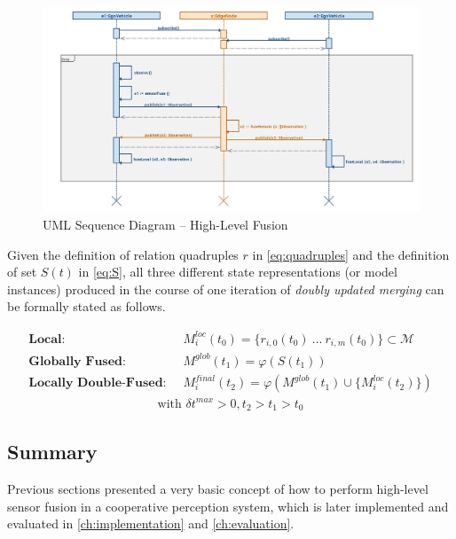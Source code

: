 \begin{figure}[H]
	\centering
	\includegraphics[width=1\linewidth]{98_images/sequence}
	\caption{UML Sequence Diagram – High-Level Fusion}
	\label{fig:sequence}
\end{figure}

Given the definition of relation quadruples $r$ in \cref{eq:quadruples} and the definition of set $S(t)$ in \cref{eq:S}, all three different state representations (or model instances) produced in the course of one iteration of \textit{doubly updated merging} can be formally stated as follows.

\begin{align}
	\textbf{Local:\ } &\  M^{loc}_i(t_0) = \{ r_{i,0}(t_0)\ ...\ r_{i,m}(t_0)\} \subset \mathcal{M} \\
	\textbf{Globally Fused:\ } &\  M^{glob}(t_1) = \varphi(S(t_1)) \\
	\textbf{Locally Double-Fused:\ } &\  M^{final}_i(t_2) = \varphi(M^{glob}(t_1) \cup \{ M_i^{loc}(t_2) \})
	\label{eq:fusion_models_overview}
\end{align}
\begin{gather*}
	\text{with\ } \delta t^{max} > 0, t_2 > t_1 > t_0
\end{gather*}

\subsection{Summary}
\label{subsec:concept_design:fusion_summary}
Previous sections presented a very basic concept of how to perform high-level sensor fusion in a cooperative perception system, which is later implemented and evaluated in \cref{ch:implementation} and \cref{ch:evaluation}. 

